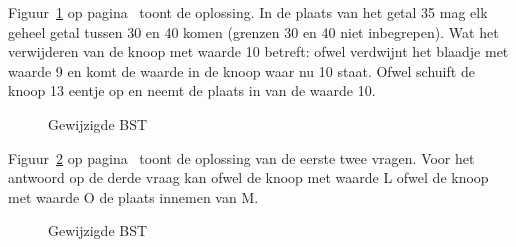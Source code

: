 \begin{Oplossing}{4.14}
Figuur~\ref{fig:bstex1opl} op pagina~\pageref{fig:bstex1opl} toont de oplossing. In de plaats van het getal 35 mag elk geheel getal tussen 30 en 40 komen (grenzen 30 en 40 niet inbegrepen). Wat het verwijderen van de knoop met waarde 10 betreft: ofwel verdwijnt het blaadje met waarde 9 en komt de waarde in de knoop waar nu 10 staat. Ofwel schuift de knoop 13 eentje op en neemt de plaats in van de waarde 10.
\begin{figure}[htbp]
    \centering
{}

\caption{Gewijzigde BST}
    \label{fig:bstex1opl}
\end{figure}
\end{Oplossing}
\begin{Oplossing}{4.15}
Figuur~\ref{fig:bstex2opl} op pagina~\pageref{fig:bstex2opl} toont de oplossing van de eerste twee vragen. Voor het antwoord op de derde vraag kan ofwel de knoop met waarde L ofwel de knoop met waarde O de plaats innemen van M.
\begin{figure}[htbp]
    \centering
{}
\caption{Gewijzigde BST}
    \label{fig:bstex2opl}
\end{figure}
\end{Oplossing}
\begin{Oplossing}{4.16}

\end{Oplossing}
